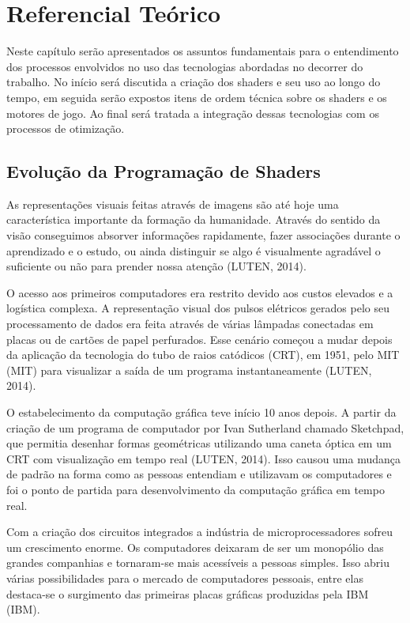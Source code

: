 \chapter{Referencial Teórico}
\label{cap:referencial-teorico}

Neste capítulo serão apresentados os assuntos fundamentais para o entendimento dos processos envolvidos no uso das tecnologias abordadas no decorrer do trabalho. No início será discutida a criação dos shaders e seu uso ao longo do tempo, em seguida serão expostos itens de ordem técnica sobre os shaders e os motores de jogo. Ao final será tratada a integração dessas tecnologias com os processos de otimização.

\section{Evolução da Programação de Shaders}
\label{sec:historia-evolucao-programacao-shaders}

As representações visuais feitas através de imagens são até hoje uma característica importante da formação da humanidade. Através do sentido da visão conseguimos absorver informações rapidamente, fazer associações durante o aprendizado e o estudo, ou ainda distinguir se algo é visualmente agradável o suficiente ou não para prender nossa atenção (LUTEN, 2014)\nocite{openGLBook}.

O acesso aos primeiros computadores era restrito devido aos custos elevados e a logística complexa. A representação visual dos pulsos elétricos gerados pelo seu processamento de dados era feita através de várias lâmpadas conectadas em placas ou de cartões de papel perfurados. Esse cenário começou a mudar depois da aplicação da tecnologia do tubo de raios catódicos (\acrshort{CRT}), em 1951, pelo \acrlong{MIT} (MIT) para visualizar a saída de um programa instantaneamente (LUTEN, 2014)\nocite{openGLBook}.

O estabelecimento da computação gráfica teve início 10 anos depois. A partir da criação de um programa de computador por Ivan Sutherland chamado Sketchpad, que permitia desenhar formas geométricas utilizando uma caneta óptica em um \acrshort{CRT} com visualização em tempo real (LUTEN, 2014)\nocite{openGLBook}. Isso causou uma mudança de padrão na forma como as pessoas entendiam e utilizavam os computadores e foi o ponto de partida para desenvolvimento da computação gráfica em tempo real.
	
Com a criação dos circuitos integrados a indústria de microprocessadores sofreu um crescimento enorme. Os computadores deixaram de ser um monopólio das grandes companhias e tornaram-se mais acessíveis a pessoas simples. Isso abriu várias possibilidades para o mercado de computadores pessoais, entre elas destaca-se o surgimento das primeiras placas gráficas produzidas pela IBM (\acrlong{IBM}).   
	
